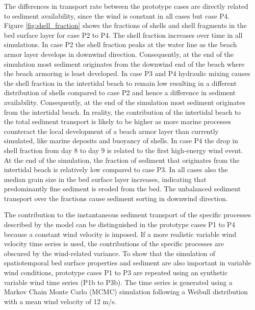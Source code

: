 The differences in transport rate between the prototype cases are
directly related to sediment availability, since the wind is constant
in all cases but case P4. Figure \ref{fig:shell_fraction} shows the
fractions of shells and shell fragments in the bed surface layer for
case P2 to P4. The shell fraction increases over time in all
simulations. In case P2 the shell fraction peaks at the water line as
the beach armor layer develops in downwind direction. Consequently, at
the end of the simulation most sediment originates from the downwind
end of the beach where the beach armoring is least developed. In case
P3 and P4 hydraulic mixing causes the shell fraction in the intertidal
beach to remain low resulting in a different distribution of shells
compared to case P2 and hence a difference in sediment
availability. Consequently, at the end of the simulation most sediment
originates from the intertidal beach. In reality, the contribution of
the intertidal beach to the total sediment transport is likely to be
higher as more marine processes counteract the local development of a
beach armor layer than currently simulated, like marine deposits and
buoyancy of shells. In case P4 the drop in shell fraction from day 8
to day 9 is related to the first high-energy wind event. At the end of
the simulation, the fraction of sediment that originates from the
intertidal beach is relatively low compared to case P3. In all cases
also the median grain size in the bed surface layer increases,
indicating that predominantly fine sediment is eroded from the
bed. The unbalanced sediment transport over the fractions cause
sediment sorting in downwind direction.


The contribution to the instantaneous sediment transport of the
specific processes described by the model can be distinguished in the
prototype cases P1 to P4 because a constant wind velocity is
imposed. If a more realistic variable wind velocity time series is
used, the contributions of the specific processes are obscured by the
wind-related variance. To show that the simulation of spatiotemporal
bed surface properties and sediment are also important in variable
wind conditions, prototype cases P1 to P3 are repeated using an
synthetic variable wind time series (P1b to P3b). The time series is
generated using a Markov Chain Monte Carlo (MCMC) simulation following
a Weibull distribution with a mean wind velocity of 12 m/s.

